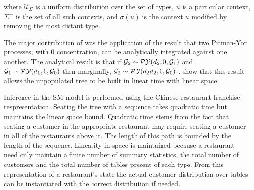 where $\mathcal{U}_{\Sigma }$ is a uniform distribution over the set of types, $u$ is a particular context, $\Sigma^+$ is the set of all such contexts, and $\sigma(u)$ is the context $u$ modified by removing the most distant type.

The major contribution of \cite{wood} was the application of the result that two Pitman-Yor processes, with 0 concentration, can be analytically integrated against one another.  The analytical result is that if $\G_2 \sim \PY(d_2, 0, \G_1)$ and  $\G_1 \sim \PY(d_1, 0, \G_0)$ then marginally, $\G_2 \sim \PY(d_2 d_2, 0, \G_0)$ \cite{someone}.  \cite{wood} show that this result allows the unpopulated tree to be built in linear time with linear space.

Inference in the SM model is performed using the Chinese restaurant franchise respresentation.  Seating the tree with a sequence takes quadratic time but maintains the linear space bound.  Quadratic time stems from the fact that seating a customer in the appropriate restaurant may require seating a customer in all of the restaurants above it.  The length of this path is bounded by the length of the sequence.  Linearity in space is maintained because a restaurant need only maintain a finite number of summary statistics, the total number of customers and the total number of tables present of each type.  From this representation of a restaurant's state the actual customer distribution over tables can be instantiated with the correct distribution if needed.

